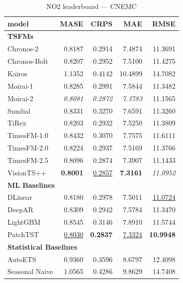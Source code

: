 \begin{table}[H]
\caption{NO2 leaderboard --- CNEMC}
\centering
\begin{small}
\begin{tabular}{lrrrr}
\toprule
model & MASE & CRPS & MAE & RMSE \\
\midrule
\multicolumn{5}{l}{\textbf{TSFMs}} \\
Chronos-2 & 0.8187 & 0.2914 & 7.4874 & 11.3691 \\
Chronos-Bolt & 0.8207 & 0.2952 & 7.5100 & 11.4275 \\
Kairos & 1.1352 & 0.4142 & 10.4899 & 14.7082 \\
Moirai-1 & 0.8285 & 0.2991 & 7.5844 & 11.3482 \\
Moirai-2 & \textit{0.8081} & \textit{0.2872} & \textit{7.3783} & 11.1565 \\
Sundial & 0.8331 & 0.3270 & 7.6591 & 11.3260 \\
TiRex & 0.8203 & 0.2932 & 7.5250 & 11.3809 \\
TimesFM-1.0 & 0.8432 & 0.3070 & 7.7575 & 11.6111 \\
TimesFM-2.0 & 0.8224 & 0.2937 & 7.5169 & 11.3766 \\
TimesFM-2.5 & 0.8096 & 0.2874 & 7.3907 & 11.1433 \\
VisionTS++ & \textbf{0.8001} & \underline{0.2857} & \textbf{7.3161} & \textit{11.0952} \\
\midrule
\multicolumn{5}{l}{\textbf{ML Baselines}} \\
DLinear & 0.8180 & 0.2978 & 7.5011 & \underline{11.0724} \\
DeepAR & 0.8309 & 0.2942 & 7.5784 & 11.3470 \\
LightGBM & 0.8545 & 0.3146 & 7.8910 & 11.5744 \\
PatchTST & \underline{0.8030} & \textbf{0.2837} & \underline{7.3324} & \textbf{10.9948} \\
\midrule
\multicolumn{5}{l}{\textbf{Statistical Baselines}} \\
AutoETS & 0.9360 & 0.3596 & 8.6797 & 12.4098 \\
Seasonal Naive & 1.0565 & 0.4286 & 9.8629 & 14.7408 \\
\bottomrule
\end{tabular}
\end{small}
\end{table}